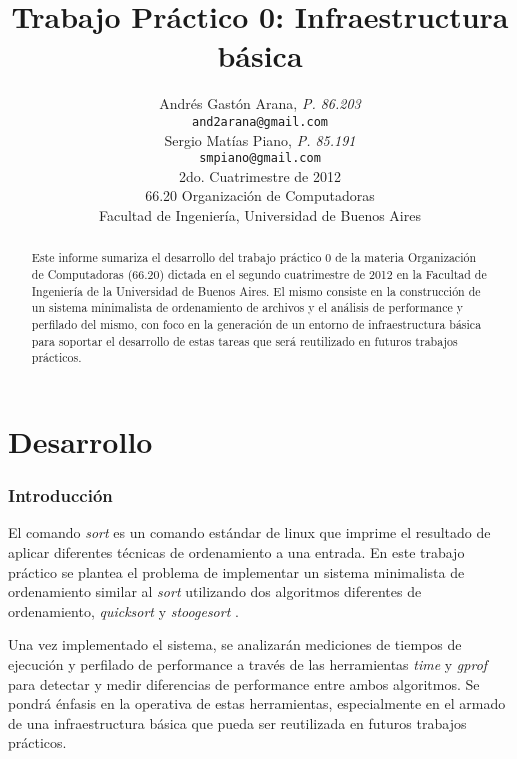 \documentclass[a4paper,11pt]{article}
\title{\textbf{Trabajo Práctico 0: Infraestructura básica}}
\author{
  Andrés Gastón Arana, \textit{P. 86.203}                          \\
  \texttt{and2arana@gmail.com}                                     \\
  Sergio Matías Piano, \textit{P. 85.191}                          \\
  \texttt{smpiano@gmail.com}                                       \\ [2.5ex]
  \normalsize{2do. Cuatrimestre de 2012}                           \\
  \normalsize{66.20 Organización de Computadoras}                  \\
  \normalsize{Facultad de Ingeniería, Universidad de Buenos Aires}
}
\date{}
\begin{document}
\thispagestyle{empty}
\maketitle

\begin{abstract}

  Este informe sumariza el desarrollo del trabajo práctico 0 de la materia
  Organización de Computadoras (66.20) dictada en el segundo cuatrimestre de
  2012 en la Facultad de Ingeniería de la Universidad de Buenos Aires. El mismo
  consiste en la construcción de un sistema minimalista de ordenamiento de
  archivos y el análisis de performance y perfilado del mismo, con foco en la
  generación de un entorno de infraestructura básica para soportar el
  desarrollo de estas tareas que será reutilizado en futuros trabajos
  prácticos.

\end{abstract}

\clearpage

\tableofcontents
\clearpage


\part{Desarrollo}

\section{Introducción}

El comando \textit{sort} \cite{WIKISORT} es un comando estándar de linux que
imprime el resultado de aplicar diferentes técnicas de ordenamiento a una
entrada. En este trabajo práctico se plantea el problema de implementar un
sistema minimalista de ordenamiento similar al \textit{sort} utilizando dos
algoritmos diferentes de ordenamiento, \textit{quicksort} \cite{WIKIQS} y
\textit{stoogesort} \cite{WIKIST}.

Una vez implementado el sistema, se analizarán mediciones de tiempos de
ejecución y perfilado de performance a través de las herramientas \textit{time}
\cite{WIKITIME} y \textit{gprof} \cite{GPROF} para detectar y medir diferencias
de performance entre ambos algoritmos. Se pondrá énfasis en la operativa de
estas herramientas, especialmente en el armado de una infraestructura básica
que pueda ser reutilizada en futuros trabajos prácticos.
\end{document}
